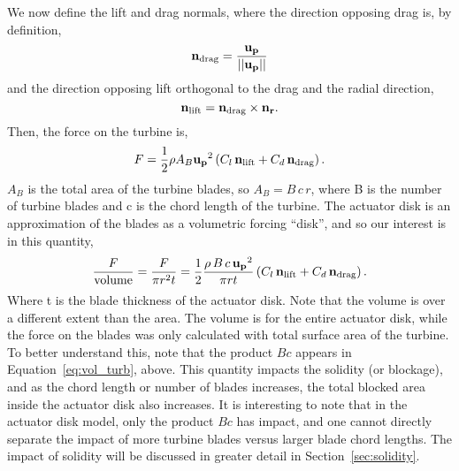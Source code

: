 We now define the lift and drag normals, where the direction opposing
drag is, by definition,  
\begin{equation}
{\bf n_{\text{drag}}} = \frac{{\bf u_p}}{||{\bf u_p}||} 
\end{equation}
and the direction opposing lift orthogonal to the drag and the radial 
direction,  
\begin{equation}
{\bf n_{\text{lift}}}= {\bf n_{\text{drag}}} \times {\bf n_r}. 
\end{equation}
%
Then, the force on the turbine is, 
\begin{equation}
 F = \frac{1}{2} \rho A_B {\bf u_p}^2 \left(C_l \,
					      {\bf n_\text{lift}} + C_d \,
					      {\bf n_\text{drag}}  \right).
\label{eq:force_turb}
\end{equation}
$A_B$ is the total area of the turbine blades, so $A_B = B\, c\, r$, where B
is the number of turbine blades and c is the chord length of the
turbine. 
The actuator disk is an approximation of the blades as a volumetric
forcing ``disk'', and so our interest is in this quantity,
\begin{equation}
\frac{F}{\text{volume}} = \frac{F}{\pi r^2 t} = \frac{1}{2}\frac{\rho\, B\, c\,
 {\bf u_p}^2}{\pi r t}\left(C_l \, {\bf n_\text{lift}} + C_d \, {\bf
		   n_\text{drag}} \right).  
\label{eq:vol_turb}
\end{equation}
Where t is the blade thickness of the actuator disk.
Note that the volume is over a different extent than the area. The
volume is for the entire actuator disk, while the force on the blades
was only calculated with total surface area of the turbine. 
To better understand this, note that the product $B c$ appears in
Equation~\ref{eq:vol_turb}, above. This quantity impacts the solidity (or
blockage), and as the chord length or number of blades increases,
the total blocked area inside the actuator disk also increases. It is
interesting to note that in the actuator disk model, only the product $B c$
has impact, and one cannot directly separate the impact of more turbine
blades versus larger blade chord lengths. 
The impact of solidity will be discussed in greater detail in
Section~\ref{sec:solidity}.

